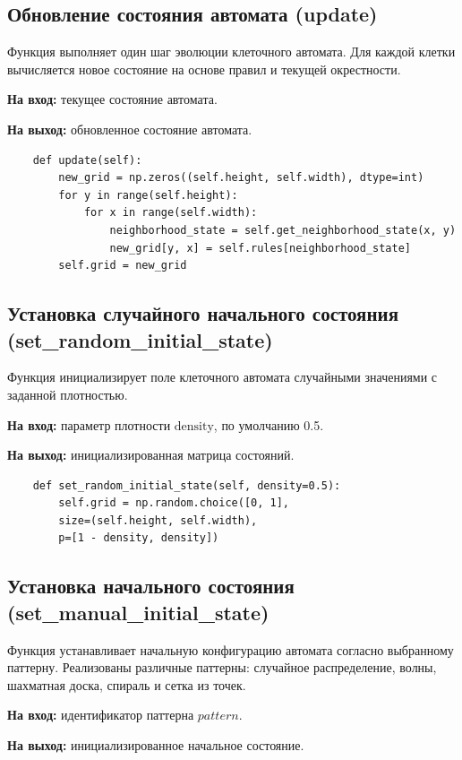 \documentclass[11pt,a4paper,final]{article}
\begin{document}
	\subsection{Обновление состояния автомата (update)}
	
	Функция выполняет один шаг эволюции клеточного автомата. Для каждой клетки вычисляется новое состояние на основе правил и текущей окрестности.
	
	\textbf{На вход:} текущее состояние автомата.  
	\par \textbf{На выход:} обновленное состояние автомата.
	
	\begin{verbatim}
	def update(self):
		new_grid = np.zeros((self.height, self.width), dtype=int)
		for y in range(self.height):
			for x in range(self.width):
				neighborhood_state = self.get_neighborhood_state(x, y)
				new_grid[y, x] = self.rules[neighborhood_state]
		self.grid = new_grid
	\end{verbatim}
	
	
	\subsection{Установка случайного начального состояния (set\_random\_initial\_state)}
	
	Функция инициализирует поле клеточного автомата случайными значениями с заданной плотностью.
	
	\textbf{На вход:} параметр плотности $\text{density}$, по умолчанию 0.5.  
	\par \textbf{На выход:} инициализированная матрица состояний.
	
	\begin{verbatim}
	def set_random_initial_state(self, density=0.5):
		self.grid = np.random.choice([0, 1], 
		size=(self.height, self.width),
		p=[1 - density, density])
	\end{verbatim}
	
	\subsection{Установка начального состояния (set\_manual\_initial\_state)}
	
	Функция устанавливает начальную конфигурацию автомата согласно выбранному паттерну. Реализованы различные паттерны: случайное распределение, волны, шахматная доска, спираль и сетка из точек.
	
	\textbf{На вход:} идентификатор паттерна $pattern$.  
	\par \textbf{На выход:} инициализированное начальное состояние.
	
\end{document}
